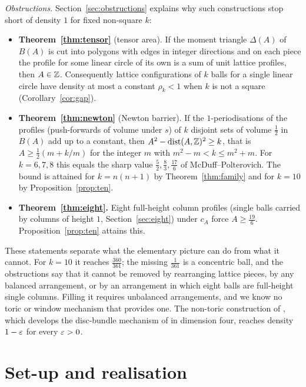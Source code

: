 \documentclass[11pt]{amsart}
\begin{document}
\emph{Obstructions.} Section~\ref{sec:obstructions} explains why such constructions stop short of density $1$ for
fixed non-square $k$:
\begin{itemize}[leftmargin=2em]
\item \textbf{Theorem~\ref{thm:tensor}} (tensor area). If the moment triangle $\Delta(A)$ of $B(A)$ is cut into polygons with edges in integer
  directions and on each piece the profile for some linear circle of its own is a sum of unit lattice profiles, then
  $A\in\mathbb{Z}$.
  Consequently lattice configurations of $k$ balls for a single linear circle have density at most a constant
  $\rho_k<1$ when $k$ is not a square (Corollary~\ref{cor:gap}).
\item \textbf{Theorem~\ref{thm:newton}} (Newton barrier). If the $1$-periodisations of the profiles (push-forwards of
  volume under $s$) of $k$ disjoint sets of volume $\frac12$ in $B(A)$ add up to a constant, then $A^2-\operatorname{dist}(A,\mathbb{Z})^2\ge k$, that is
  $A\ge\frac12(m+k/m)$ for the integer $m$ with $m^2-m<k\le m^2+m$. For $k=6,7,8$ this equals the sharp value
  $\frac52,\frac83,\frac{17}{6}$ of McDuff--Polterovich. The bound is attained for $k=n(n+1)$ by
  Theorem~\ref{thm:family} and for $k=10$ by Proposition~\ref{prop:ten}.
\item \textbf{Theorem~\ref{thm:eight}.} Eight full-height column profiles (single balls carried by columns of
  height $1$, Section~\ref{sec:eight}) under $c_A$ force $A\ge\frac{19}{6}$.
  Proposition~\ref{prop:ten} attains this.
\end{itemize}

These statements separate what the elementary picture can do from what it cannot. For $k=10$ it reaches
$\frac{360}{361}$; the missing $\frac1{361}$ is a concentric ball, and the obstructions say that it cannot be
removed by rearranging lattice pieces, by any balanced arrangement, or by an arrangement in which eight balls
are full-height single columns. Filling it requires unbalanced arrangements, and we know no toric or window
mechanism that provides one. The non-toric construction of \cite{SongP1}, which develops the disc-bundle mechanism of
\cite{OpenAI2026} in dimension four, reaches density $1-\varepsilon$ for every $\varepsilon>0$.

\section{Set-up and realisation}\label{sec:setup}
\end{document}
